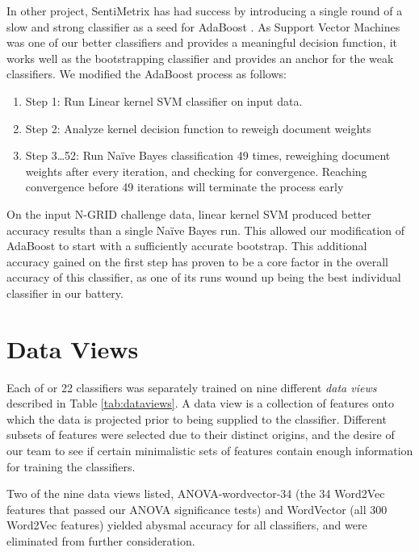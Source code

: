 In other project, SentiMetrix has had success by introducing a single round of a slow and strong classifier as a seed for AdaBoost \cite{darpa}. As Support Vector Machines was one of our better classifiers and provides a meaningful decision function, it works well as the bootstrapping classifier and provides an anchor for the weak classifiers. We modified the AdaBoost process as follows:

\begin{enumerate}
    \item \textsf{Step 1:} Run Linear kernel SVM classifier on input data. 
    \item \textsf{Step 2:} Analyze kernel decision function to reweigh document weights
    \item \textsf{Step 3\ldots52:} Run Na\"{i}ve Bayes classification 49 times, reweighing document weights after every iteration, and checking for convergence. Reaching convergence before 49 iterations will terminate the process early
\end{enumerate}

On the input N-GRID challenge data, linear kernel SVM produced better
accuracy results than a single Na\"{i}ve Bayes run. This allowed our 
modification of AdaBoost to start with a sufficiently accurate bootstrap.
This additional accuracy gained on the first step has proven to be 
a core factor in the overall accuracy of this classifier, as one
of its runs wound up being the best individual classifier in our
battery.


\section{Data Views}

Each of or 22 classifiers 
was separately trained on nine different \textit{data views} described
in Table \ref{tab:dataviews}.  A data view is a collection of features
onto which the data is projected prior to being supplied to the classifier.
Different subsets of features were selected due to their distinct origins,
and the desire of our team to see if certain minimalistic sets of
features contain enough information for training the classifiers.

Two of the nine data views listed, 
\textsf{ANOVA-wordvector-34} (the 34 \textsf{Word2Vec} features that
passed our ANOVA significance tests) and \textsf{WordVector}
(all 300 \textsf{Word2Vec} features) yielded abysmal accuracy for
all classifiers, and were eliminated from further consideration.

